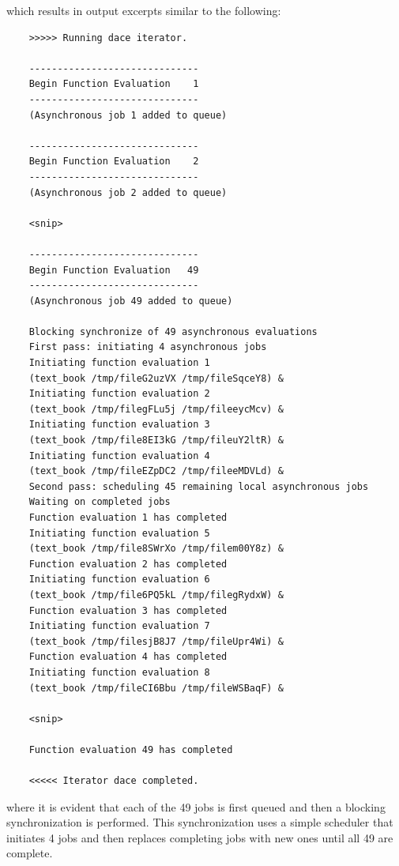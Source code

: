 which results in output excerpts similar to the following:
\begin{small}
\begin{verbatim}
    >>>>> Running dace iterator.

    ------------------------------
    Begin Function Evaluation    1
    ------------------------------
    (Asynchronous job 1 added to queue)

    ------------------------------
    Begin Function Evaluation    2
    ------------------------------
    (Asynchronous job 2 added to queue)

    <snip>

    ------------------------------
    Begin Function Evaluation   49
    ------------------------------
    (Asynchronous job 49 added to queue)

    Blocking synchronize of 49 asynchronous evaluations
    First pass: initiating 4 asynchronous jobs
    Initiating function evaluation 1
    (text_book /tmp/fileG2uzVX /tmp/fileSqceY8) &
    Initiating function evaluation 2
    (text_book /tmp/filegFLu5j /tmp/fileeycMcv) &
    Initiating function evaluation 3
    (text_book /tmp/file8EI3kG /tmp/fileuY2ltR) &
    Initiating function evaluation 4
    (text_book /tmp/fileEZpDC2 /tmp/fileeMDVLd) &
    Second pass: scheduling 45 remaining local asynchronous jobs
    Waiting on completed jobs
    Function evaluation 1 has completed
    Initiating function evaluation 5
    (text_book /tmp/file8SWrXo /tmp/filem00Y8z) &
    Function evaluation 2 has completed
    Initiating function evaluation 6
    (text_book /tmp/file6PQ5kL /tmp/filegRydxW) &
    Function evaluation 3 has completed
    Initiating function evaluation 7
    (text_book /tmp/filesjB8J7 /tmp/fileUpr4Wi) &
    Function evaluation 4 has completed
    Initiating function evaluation 8
    (text_book /tmp/fileCI6Bbu /tmp/fileWSBaqF) &

    <snip>

    Function evaluation 49 has completed

    <<<<< Iterator dace completed.
\end{verbatim}
\end{small}
where it is evident that each of the 49 jobs is first queued and then
a blocking synchronization is performed.  This synchronization uses a
simple scheduler that initiates 4 jobs and then replaces completing
jobs with new ones until all 49 are complete.

